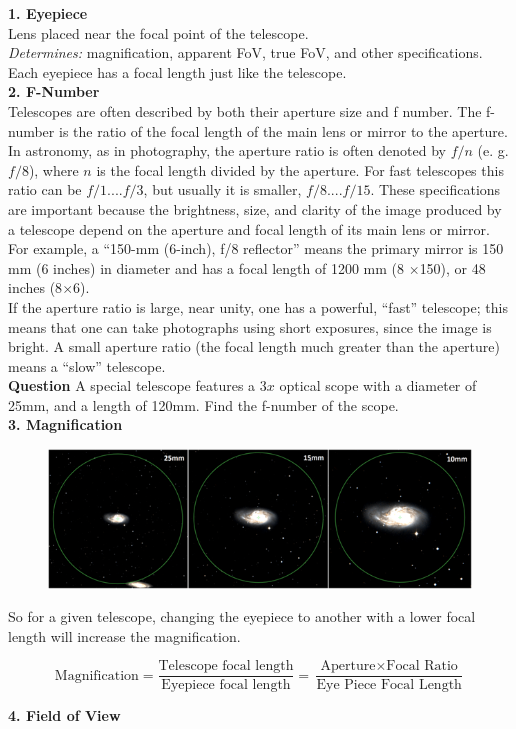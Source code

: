 \documentclass[a4paper,12pt]{extarticle}
\begin{document}
\textbf{1. Eyepiece}\\ 

Lens placed near the focal point of the telescope.\\
\textit{Determines:} magnification, apparent FoV, true FoV, and other specifications. Each eyepiece has a focal length just like the telescope.\\


\textbf{2. F-Number}\\ 

Telescopes are often described by both their aperture size and f number. The f-number is the ratio of the focal length of the main lens or mirror to the aperture. In astronomy, as in photography, the aperture ratio is often denoted by $f/n$ (e. g. $f/8$), where $n$ is the focal length divided by the aperture. For fast telescopes this ratio can be $f/1. . . . f/3$, but usually it is smaller, $f/8. . . . f/15$. These specifications are important because the brightness, size, and clarity of the image produced by a telescope depend on the aperture and focal length of its main lens or mirror. For example, a “150-mm (6-inch), f/8 reflector” means the primary mirror is 150 mm (6 inches) in diameter and has a focal length of 1200 mm (8 $\times$150), or 48 inches (8$\times$6).\\

If the aperture ratio is large, near unity, one has a powerful, ``fast'' telescope; this means that one can take photographs using short exposures, since the image is bright. A small aperture ratio (the focal length much greater than the aperture) means a ``slow'' telescope.\\

\textsf{\textbf{Question}} A special telescope features a $3x$ optical scope  with a diameter of 25mm, and a length of 120mm. Find the f-number of the scope.\\

\textbf{3. Magnification}\\
\begin{figure}[H]
	\centering
	\includegraphics[width=0.8\linewidth]{tel_magnify.png}
\end{figure}
So for a given telescope, changing the eyepiece to another with a lower focal length will increase the magnification.
\begin{defi}
	\[\text{Magnification}=\frac{\text{Telescope focal length}}{\text{Eyepiece focal length}}=\frac{\text{Aperture}\times \text{Focal Ratio}}{\text{Eye Piece Focal Length}}\]
\end{defi} 
\textbf{4. Field of View}\\
\end{document}
